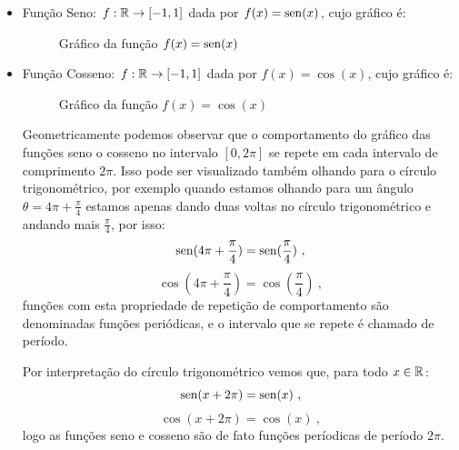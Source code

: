   \begin{itemize}
  \item Função Seno: $f: \mathbb{R} \rightarrow [-1, 1]$ dada por $f(x)= \operatorname{sen} (x)$, cujo gráfico é:

  \begin{figure}[H]
  \centering
    \caption{Gráfico da função $f(x)= \operatorname{sen}(x)$}
  \end{figure}

  \item Função Cosseno: $f: \mathbb{R} \rightarrow [-1, 1]$ dada por $f(x)= \cos(x)$, cujo gráfico é:

  \begin{figure}[H]
  \centering
    \caption{Gráfico da função $f(x)= \cos(x)$}
  \end{figure}

  Geometricamente podemos observar que o comportamento do gráfico das funções seno o cosseno no intervalo $[0, 2\pi]$ se repete em cada intervalo de comprimento $2\pi$. Isso pode ser visualizado também olhando para o círculo trigonométrico, por exemplo quando estamos olhando para um ângulo $\theta= 4\pi + \frac{\pi}{4}$ estamos apenas dando duas voltas no círculo trigonométrico e andando mais $\frac{\pi}{4}$, por isso:
  \[\operatorname{sen}(4\pi + \frac{\pi}{4})= \operatorname{sen}(\frac{\pi}{4}) \ ,\]
  \[\cos(4\pi + \frac{\pi}{4})= \cos(\frac{\pi}{4}) \ , \]
  funções com esta propriedade de repetição de comportamento são denominadas funções periódicas, e o intervalo que se repete é chamado de período.

  Por interpretação do círculo trigonométrico vemos que, para todo $x \in \mathbb{R}$:
  \[\operatorname{sen}(x + 2 \pi)= \operatorname{sen}(x) \ ,\]
  \[\cos(x + 2\pi)= \cos(x) \ , \]
  logo as funções seno e cosseno são de fato funções períodicas de período $2\pi$.


\end{itemize}
